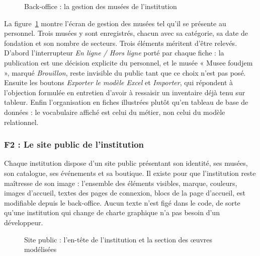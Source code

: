 \begin{figure}[htbp]
\centering
{}
\caption{Back-office : la gestion des musées de l'institution}
\label{fig:cap-erp}
\end{figure}

La figure~\ref{fig:cap-erp} montre l'écran de gestion des musées tel qu'il se
présente au personnel. Trois musées y sont enregistrés, chacun avec sa
catégorie, sa date de fondation et son nombre de secteurs. Trois éléments
méritent d'être relevés. D'abord l'interrupteur \emph{En ligne / Hors ligne}
porté par chaque fiche : la publication est une décision explicite du personnel,
et le musée « Musee foudjem », marqué \emph{Brouillon}, reste invisible du public
tant que ce choix n'est pas posé. Ensuite les boutons \emph{Exporter le modèle
Excel} et \emph{Importer}, qui répondent à l'objection formulée en entretien
d'avoir à ressaisir un inventaire déjà tenu sur tableur. Enfin l'organisation en
fiches illustrées plutôt qu'en tableau de base de données : le vocabulaire
affiché est celui du métier, non celui du modèle relationnel.

\subsubsection{F2 : Le site public de l'institution}

Chaque institution dispose d'un site public présentant son identité, ses musées,
son catalogue, ses événements et sa boutique. Il existe pour que l'institution
reste maîtresse de son image : l'ensemble des éléments visibles, marque,
couleurs, images d'accueil, textes des pages de connexion, blocs de la page
d'accueil, est modifiable depuis le back-office. Aucun texte n'est figé dans le
code, de sorte qu'une institution qui change de charte graphique n'a pas besoin
d'un développeur.

\begin{figure}[htbp]
\centering
{}
\caption{Site public : l'en-tête de l'institution et la section des œuvres modélisées}
\label{fig:cap-public}
\end{figure}

